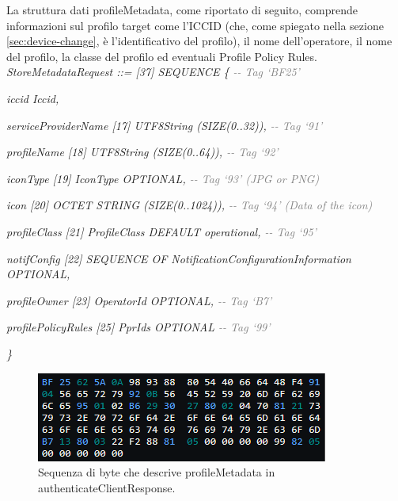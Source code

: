 \documentclass[10pt, oneside]{book}
\begin{document}
\noindent La struttura dati profileMetadata, come riportato di seguito, comprende informazioni sul profilo target come l'ICCID (che, come spiegato nella sezione \ref{sec:device-change}, è l'identificativo del profilo), il nome dell'operatore, il nome del profilo, la classe del profilo ed eventuali Profile Policy Rules.\\

\textit{StoreMetadataRequest ::= [37] SEQUENCE \{ \textcolor{gray}{{-}{-} Tag `BF25'}}

\hspace{0.75cm} \textit{iccid Iccid,}

\hspace{0.75cm} \textit{serviceProviderName [17] UTF8String (SIZE(0..32)), \textcolor{gray}{{-}{-} Tag `91'}}

\hspace{0.75cm} \textit{profileName [18] UTF8String (SIZE(0..64)), \textcolor{gray}{{-}{-} Tag `92'}}

\hspace{0.75cm} \textit{iconType [19] IconType OPTIONAL, \textcolor{gray}{{-}{-} Tag `93' (JPG or PNG)}}

\hspace{0.75cm} \textit{icon [20] OCTET STRING (SIZE(0..1024)), \textcolor{gray}{{-}{-} Tag `94' (Data of the icon)}}

\hspace{0.75cm} \textit{profileClass [21] ProfileClass DEFAULT operational, \textcolor{gray}{{-}{-} Tag `95'}}

\hspace{0.75cm} \textit{notifConfig [22] SEQUENCE OF NotificationConfigurationInformation OPTIONAL,}

\hspace{0.75cm} \textit{profileOwner [23] OperatorId OPTIONAL, \textcolor{gray}{{-}{-} Tag `B7'}}

\hspace{0.75cm} \textit{profilePolicyRules [25] PprIds OPTIONAL \textcolor{gray}{{-}{-} Tag `99'}}

\textit{\}\\}

\begin{figure}
\includegraphics[width=\linewidth]{asn1-profileMetadata.png}
\caption{Sequenza di byte che descrive profileMetadata in authenticateClientResponse.}
\label{fig:asn1-profileMetadata}
\end{figure}
\end{document}
